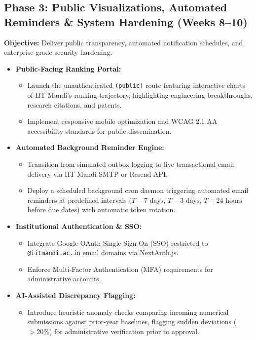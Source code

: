 \documentclass[11pt,a4paper]{article}
\begin{document}
\subsection{Phase 3: Public Visualizations, Automated Reminders \& System Hardening (Weeks 8--10)}
\textbf{Objective:} Deliver public transparency, automated notification schedules, and enterprise-grade security hardening.
\begin{itemize}[leftmargin=1.4em, itemsep=2.5pt]
\item \textbf{Public-Facing Ranking Portal:}
  \begin{itemize}[leftmargin=1.2em, itemsep=1.5pt]
  \item Launch the unauthenticated \texttt{(public)} route featuring interactive charts of IIT Mandi's ranking trajectory, highlighting engineering breakthroughs, research citations, and patents.
  \item Implement responsive mobile optimization and WCAG 2.1 AA accessibility standards for public dissemination.
  \end{itemize}
\item \textbf{Automated Background Reminder Engine:}
  \begin{itemize}[leftmargin=1.2em, itemsep=1.5pt]
  \item Transition from simulated outbox logging to live transactional email delivery via IIT Mandi SMTP or Resend API.
  \item Deploy a scheduled background cron daemon triggering automated email reminders at predefined intervals ($T-7\text{ days}$, $T-3\text{ days}$, $T-24\text{ hours}$ before due dates) with automatic token rotation.
  \end{itemize}
\item \textbf{Institutional Authentication \& SSO:}
  \begin{itemize}[leftmargin=1.2em, itemsep=1.5pt]
  \item Integrate Google OAuth Single Sign-On (SSO) restricted to \texttt{@iitmandi.ac.in} email domains via NextAuth.js.
  \item Enforce Multi-Factor Authentication (MFA) requirements for administrative accounts.
  \end{itemize}
\item \textbf{AI-Assisted Discrepancy Flagging:}
  \begin{itemize}[leftmargin=1.2em, itemsep=1.5pt]
  \item Introduce heuristic anomaly checks comparing incoming numerical submissions against prior-year baselines, flagging sudden deviations ($> 20\%$) for administrative verification prior to approval.
  \end{itemize}
\end{itemize}
\end{document}
